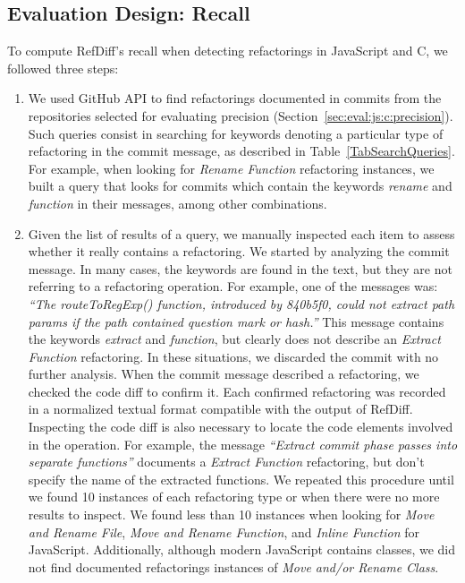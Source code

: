 \subsection{Evaluation Design: Recall}
\label{sec:eval:js:c:recall}


To compute RefDiff's recall when detecting refactorings in JavaScript and C, we followed three steps:

\begin{enumerate}  
\item We used GitHub API to find refactorings documented in commits from the repositories selected for evaluating precision (Section~\ref{sec:eval:js:c:precision}). Such queries consist in searching for keywords denoting a particular type of refactoring in the commit message, as described in Table~\ref{TabSearchQueries}. For example, when looking for \emph{Rename Function} refactoring instances, we built a query that looks for commits which contain the keywords \textit{rename} and \textit{function} in their messages, among other combinations.

\item Given the list of results of a query, we manually inspected each item to assess whether it really contains a refactoring. We started by analyzing the commit message. 
In many cases, the keywords are found in the text, but they are not referring to a refactoring operation.
For example, one of the messages was: \textit{``The routeToRegExp() function, introduced by 840b5f0, could not extract path params if the path contained question mark or hash.''}
This message contains the keywords \textit{extract} and \textit{function}, but clearly does not describe an \emph{Extract Function} refactoring.
In these situations, we discarded the commit with no further analysis.
When the commit message described a refactoring, we checked the code diff to confirm it.
Each confirmed refactoring was recorded in a normalized textual format compatible with the output of RefDiff.
Inspecting the code diff is also necessary to locate the code elements involved in the operation.
For example, the message \textit{``Extract commit phase passes into separate functions''} documents a \emph{Extract Function} refactoring, but don't specify the name of the extracted functions.
We repeated this procedure until we found 10 instances of each refactoring type or when there were no more results to inspect. We found less than 10 instances when looking for \emph{Move and Rename File}, \emph{Move and Rename Function}, and \emph{Inline Function} for JavaScript. Additionally, although modern JavaScript contains classes, we did not find documented refactorings instances of \emph{Move and/or Rename Class}.




\end{enumerate}
